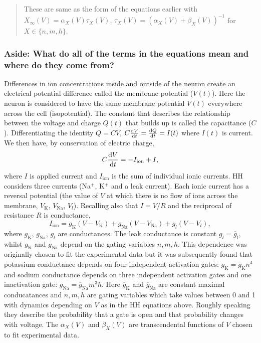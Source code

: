 \documentclass[11pt]{article}
\begin{document}
\begin{quote}
These are same as the form of the equations earlier with
\(X_\infty(V) = \alpha_X(V) \tau_X(V)\),
\(\tau_X(V) = (\alpha_X(V) + \beta_X(V))^{-1}\) for
\(X \in \{ n, m, h\}\).
\end{quote}

    \hypertarget{aside-what-do-all-of-the-terms-in-the-equations-mean-and-where-do-they-come-from}{%
\subsubsection{Aside: What do all of the terms in the equations mean and
where do they come
from?}\label{aside-what-do-all-of-the-terms-in-the-equations-mean-and-where-do-they-come-from}}

Differences in ion concentrations inside and outside of the neuron
create an electrical potential difference called the membrane potential
(\(V(t)\)). Here the neuron is considered to have the same membrane
potential \(V(t)\) everywhere across the cell (isopotential). The
constant that describes the relationship between the voltage and charge
\(Q(t)\) that builds up is called the capacitance (\(C\)).
Differentiating the identity \(Q=CV\),
\(C \frac{{\rm d}V}{{\rm d} t} = \frac{{\rm d}Q}{{\rm d} t} = I(t)\)
where \(I(t)\) is current. We then have, by conservation of electric
charge, \[ C  \frac{{\rm d}V}{{\rm d} t} = - I_{\text{ion}} + I,\] where
\(I\) is applied current and \(I_{\text{ion}}\) is the sum of individual
ionic currents. HH considers three currents (Na\(^+\), K\(^+\) and a
leak current). Each ionic current has a reversal potential (the value of
\(V\) at which there is no flow of ions across the membrane,
\(V_{\text{K}}\), \(V_{\text{Na}}\), \(V_{l}\)). Recalling also that
\(I = V/R\) and the reciprocal of resistance \(R\) is conductance,
\[I_{\text{ion}} = g_{\text{K}}(V-V_\text{K}) + g_{\text{Na}}(V-V_\text{Na}) + g_{l}(V-V_l),\]
where \(g_{\text{K}}\), \(g_{\text{Na}}\), \(g_l\) are conductances. The
leak conductance is constant \(g_l = \overline{g}_l\), whilst
\(g_{\text{K}}\) and \(g_{\text{Na}}\) depend on the gating variables
\(n, m, h\). This dependence was originally chosen to fit the
experimental data but it was subsequently found that potassium
conductance depends on four independent activation gates:
\(g_{\text{K}}= \overline{g}_{\text{K}} n^4\) and sodium conductance
depends on three independent activation gates and one inactivation gate:
\(g_{\text{Na}}= \overline{g}_{\text{Na}} m^3 h\). Here
\(\overline{g}_{\text{K}}\) and \(\overline{g}_{\text{Na}}\) are
constant maximal conducatances and \(n, m, h\) are gating variables
which take values between 0 and 1 with dynamics depending on \(V\) as in
the HH equations above. Roughly speaking they describe the probability
that a gate is open and that probability changes with voltage. The
\(\alpha_X(V)\) and \(\beta_X(V)\) are transcendental functions of \(V\)
chosen to fit experimental data.
\end{document}
